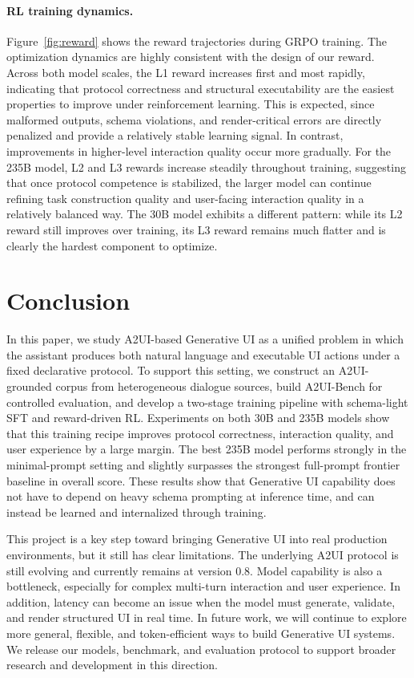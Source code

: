\documentclass{llmxive}
\begin{document}
\paragraph{RL training dynamics.}
Figure~\ref{fig:reward} shows the reward trajectories during GRPO training. The optimization dynamics are highly consistent with the design of our reward. Across both model scales, the L1 reward increases first and most rapidly, indicating that protocol correctness and structural executability are the easiest properties to improve under reinforcement learning. This is expected, since malformed outputs, schema violations, and render-critical errors are directly penalized and provide a relatively stable learning signal. In contrast, improvements in higher-level interaction quality occur more gradually. For the 235B model, L2 and L3 rewards increase steadily throughout training, suggesting that once protocol competence is stabilized, the larger model can continue refining task construction quality and user-facing interaction quality in a relatively balanced way. The 30B model exhibits a different pattern: while its L2 reward still improves over training, its L3 reward remains much flatter and is clearly the hardest component to optimize.

\section{Conclusion}

In this paper, we study A2UI-based Generative UI as a unified problem in which the assistant produces both natural language and executable UI actions under a fixed declarative protocol. To support this setting, we construct an A2UI-grounded corpus from heterogeneous dialogue sources, build A2UI-Bench for controlled evaluation, and develop a two-stage training pipeline with schema-light SFT and reward-driven RL. Experiments on both 30B and 235B models show that this training recipe improves protocol correctness, interaction quality, and user experience by a large margin. The best 235B model performs strongly in the minimal-prompt setting and slightly surpasses the strongest full-prompt frontier baseline in overall score. These results show that Generative UI capability does not have to depend on heavy schema prompting at inference time, and can instead be learned and internalized through training.

This project is a key step toward bringing Generative UI into real production environments, but it still has clear limitations. The underlying A2UI protocol is still evolving and currently remains at version 0.8. Model capability is also a bottleneck, especially for complex multi-turn interaction and user experience. In addition, latency can become an issue when the model must generate, validate, and render structured UI in real time. In future work, we will continue to explore more general, flexible, and token-efficient ways to build Generative UI systems. We release our models, benchmark, and evaluation protocol to support broader research and development in this direction.
\end{document}
